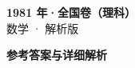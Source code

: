 \documentclass[zihao=-4, a4paper]{ctexart}
\begin{document}
\begin{center}
  {\Large\bfseries 1981 年·全国卷（理科）}\\[4pt]
  {\large 数学 · 解析版}
\end{center}
\medskip
{}

\clearpage
{}
\begin{center}{\Large\bfseries 参考答案与详细解析}\end{center}
\medskip

\end{document}
